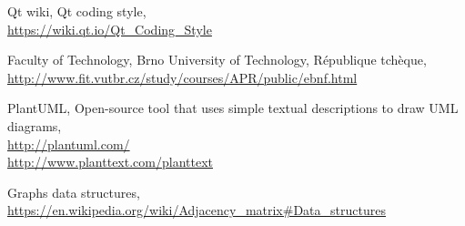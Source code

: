 \documentclass[french]{article}
\begin{document}
	\begin{thebibliography}{9}
		Qt wiki, Qt coding style,\\ \url{https://wiki.qt.io/Qt_Coding_Style}
		
		Faculty of Technology, Brno University of Technology, République tchèque,\\ \url{http://www.fit.vutbr.cz/study/courses/APR/public/ebnf.html}
		
		PlantUML, Open-source tool that uses simple textual descriptions to draw UML diagrams,\\ \url{http://plantuml.com/}\\ \url{http://www.planttext.com/planttext}

		Graphs data structures,\\ \url{https://en.wikipedia.org/wiki/Adjacency_matrix#Data_structures}
	\end{thebibliography}			
\end{document}

